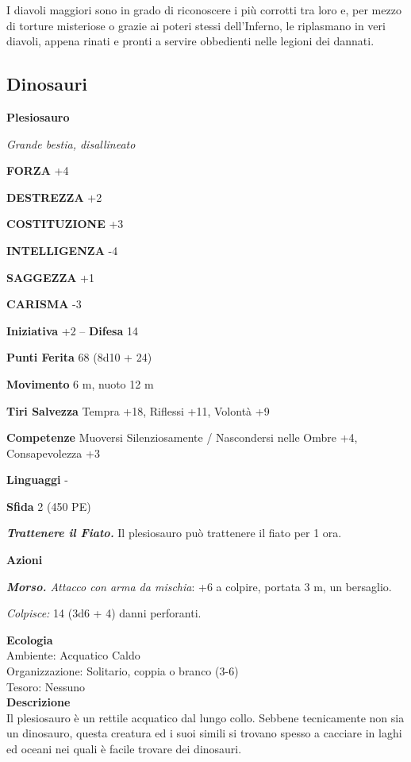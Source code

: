 \begin{multicols}{2}
I diavoli maggiori sono in grado di riconoscere i più corrotti tra loro e, per mezzo di torture misteriose o grazie ai poteri stessi dell'Inferno, le riplasmano in veri diavoli, appena rinati e pronti a servire obbedienti nelle legioni dei dannati.\\


\subsection{Dinosauri}

\medskip{}\textbf{Plesiosauro}

\emph{Grande bestia, disallineato}

\textbf{FORZA} +4

\textbf{DESTREZZA} +2

\textbf{COSTITUZIONE} +3

\textbf{INTELLIGENZA} -4

\textbf{SAGGEZZA} +1

\textbf{CARISMA} -3

\textbf{Iniziativa} +2 -- \textbf{Difesa} 14

\textbf{Punti Ferita} 68 (8d10 + 24)

\textbf{Movimento} 6 m, nuoto 12 m

\textbf{Tiri Salvezza} Tempra +18, Riflessi +11, Volontà +9

\textbf{Competenze} Muoversi Silenziosamente / Nascondersi nelle Ombre +4, Consapevolezza +3

\textbf{Linguaggi} -

\textbf{Sfida} 2 (450 PE)

\emph{\textbf{Trattenere il Fiato.}} Il plesiosauro può trattenere il fiato per 1 ora.

\textbf{Azioni}

\emph{\textbf{Morso.} Attacco con arma da mischia}: +6 a colpire, portata 3 m, un bersaglio.

\emph{Colpisce:} 14 (3d6 + 4) danni perforanti.

\textbf{Ecologia}\\
Ambiente: Acquatico Caldo\\
Organizzazione: Solitario, coppia o branco (3-6)\\
Tesoro: Nessuno\\
\textbf{Descrizione}\\
Il plesiosauro è un rettile acquatico dal lungo collo. Sebbene tecnicamente non sia un dinosauro, questa creatura ed i suoi simili si trovano spesso a cacciare in laghi ed oceani nei quali è facile trovare dei dinosauri.\\



\end{multicols}
